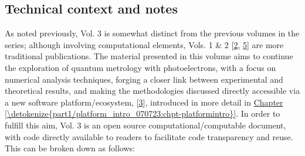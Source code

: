 \documentclass[letterpaper,table,10pt,english]{jupyterBook}
\begin{document}
\subsection{Technical context and notes}
\label{\detokenize{part1/main_intro_060723:technical-context-and-notes}}\label{\detokenize{part1/main_intro_060723:sec-intro-technical-notes}}
\sphinxAtStartPar
As noted previously, Vol. 3 is somewhat distinct from the previous volumes in the series; although involving computational elements,  Vols. 1 \& 2 {[}\hyperlink{cite.backmatter/bibliography:id663}{2}, \hyperlink{cite.backmatter/bibliography:id664}{5}{]} are more traditional publications. The material presented in this volume aims to continue the exploration of quantum metrology with photoelectrons, with a focus on numerical analysis techniques, forging a closer link between experimental and theoretical results, and making the methodologies discussed directly accessible via a new software platform/ecosystem,  {[}\hyperlink{cite.backmatter/bibliography:id668}{3}{]}, introduced in more detail in \hyperref[\detokenize{part1/platform_intro_070723:chpt-platformintro}]{Chapter \ref{\detokenize{part1/platform_intro_070723:chpt-platformintro}}}.
In order to fulfill this aim, Vol. 3 is an open source computational/computable document, with code directly available to readers to facilitate code transparency and reuse. This can be broken down as follows:
\end{document}
